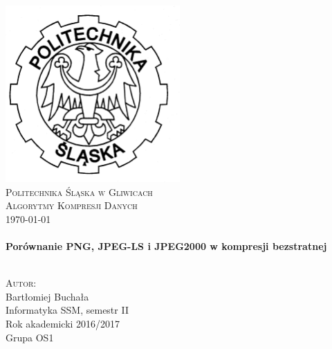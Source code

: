 \begin{titlepage}
	\begin{center}
		
		\includegraphics[width=0.5\textwidth]{logo.png}~\\[1cm]
		
		\textsc{\LARGE Politechnika Śląska w Gliwicach}\\[1.5cm]
		
		\textsc{\Large Algorytmy Kompresji Danych}\\
		\textsc{\today}\\[0.5cm]
		
		\HRule \\[0.4cm]
		{ \huge \bfseries Porównanie PNG, JPEG-LS i JPEG2000 w kompresji bezstratnej \\[0.4cm] }
		
		\HRule \\[1.5cm]
		
		\textsc{\Large Autor:} \\
		Bartłomiej Buchała \\
		[1.0cm]
		Informatyka SSM, semestr II \\
		Rok akademicki 2016/2017 \\
		Grupa OS1
		
		\vfill

	\vfill
\end{center}
\end{titlepage}